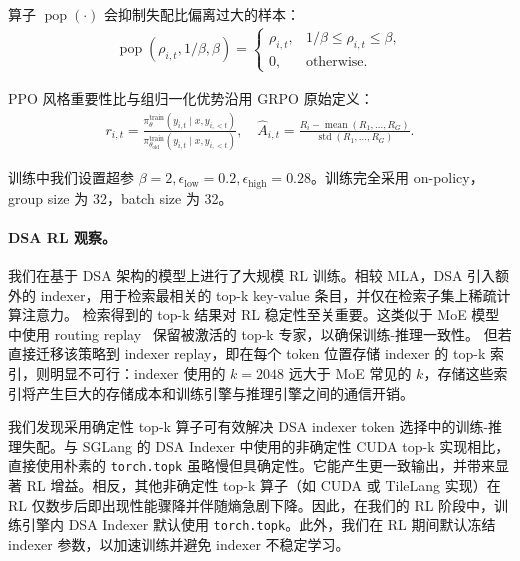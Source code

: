 算子 $\operatorname{pop}(\cdot)$ 会抑制失配比偏离过大的样本：
\begin{align*}
\operatorname{pop}(\rho_{i,t}, 1/\beta, \beta)
=
\begin{cases}
\rho_{i,t}, & 1/\beta \le \rho_{i,t} \le \beta, \\
0, & \text{otherwise}.
\end{cases}
\end{align*}

PPO 风格重要性比与组归一化优势沿用 GRPO 原始定义：
\begin{align*}
r_{i,t}
=
\frac{
\pi_\theta^{\text{train}}(y_{i,t}\mid x,y_{i,<t})
}{
\pi_{\theta_{\text{old}}}^{\text{train}}(y_{i,t}\mid x,y_{i,<t})
},
\quad
\hat{A}_{i,t}
=
\frac{
R_i - \operatorname{mean}(R_1,\dots,R_G)
}{
\operatorname{std}(R_1,\dots,R_G)
}.
\end{align*}

训练中我们设置超参 $\beta=2, \epsilon_{\text{low}}=0.2, \epsilon_{\text{high}}=0.28$。训练完全采用 on-policy，group size 为 32，batch size 为 32。

\paragraph{DSA RL 观察。}
我们在基于 DSA 架构的模型上进行了大规模 RL 训练。相较 MLA，DSA 引入额外的 indexer，用于检索最相关的 top-k key-value 条目，并仅在检索子集上稀疏计算注意力。
检索得到的 top-k 结果对 RL 稳定性至关重要。这类似于 MoE 模型中使用 routing replay~\cite{zheng2025group} 保留被激活的 top-k 专家，以确保训练-推理一致性。
但若直接迁移该策略到 indexer replay，即在每个 token 位置存储 indexer 的 top-k 索引，则明显不可行：indexer 使用的 $k = 2048$ 远大于 MoE 常见的 $k$，存储这些索引将产生巨大的存储成本和训练引擎与推理引擎之间的通信开销。

我们发现采用确定性 top-k 算子可有效解决 DSA indexer token 选择中的训练-推理失配。与 SGLang 的 DSA Indexer 中使用的非确定性 CUDA top-k 实现相比，直接使用朴素的 \texttt{torch.topk} 虽略慢但具确定性。它能产生更一致输出，并带来显著 RL 增益。相反，其他非确定性 top-k 算子（如 CUDA 或 TileLang 实现）在 RL 仅数步后即出现性能骤降并伴随熵急剧下降。因此，在我们的 RL 阶段中，训练引擎内 DSA Indexer 默认使用 \texttt{torch.topk}。此外，我们在 RL 期间默认冻结 indexer 参数，以加速训练并避免 indexer 不稳定学习。

